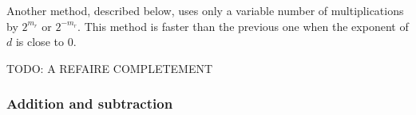 Another method, described below, uses only a variable number of
multiplications by $2^{m_r}$ or $2^{-m_r}$. This method is faster than the previous
one when the exponent of $d$ is close to $0$.

TODO:
A REFAIRE COMPLETEMENT


\subsubsection{Addition and subtraction}


